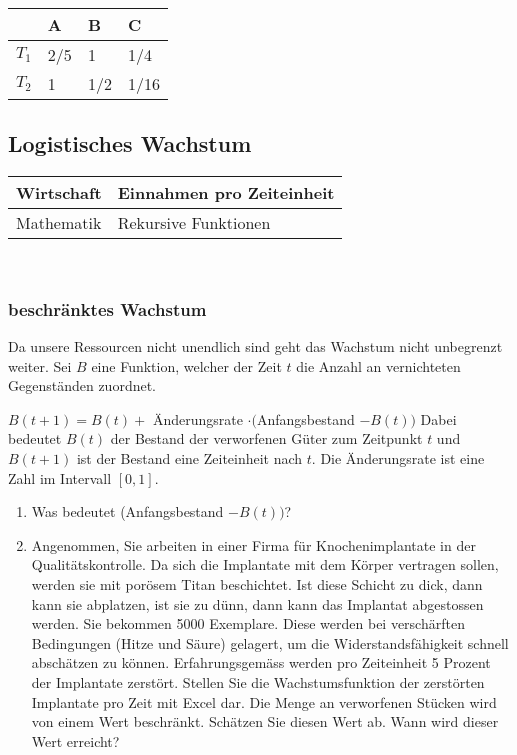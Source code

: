 \documentclass[11pt, twocolumn, a4paper]{scrartcl}
\begin{document}
\begin{tabular}{l l l l}
\toprule
&A&B&C\\
\midrule
$T_1$&2/5&1&1/4\\
\midrule
$T_2$&1&1/2&1/16\\
\bottomrule
\end{tabular}


\subsection{Logistisches Wachstum}



\begin{tabular}{l l}
\toprule
Wirtschaft & Einnahmen pro Zeiteinheit \\
\midrule
Mathematik& Rekursive Funktionen \\

\bottomrule
\end{tabular}\\

\subsubsection{beschränktes Wachstum}
Da unsere Ressourcen nicht unendlich sind geht das Wachstum nicht unbegrenzt weiter.
Sei $B$ eine Funktion, welcher der Zeit $t$ die Anzahl an vernichteten Gegenständen zuordnet.

$B(t+1) = B(t) +$ Änderungsrate $\cdot ($Anfangsbestand $- B(t))$
Dabei bedeutet $B(t)$ der Bestand der verworfenen Güter zum Zeitpunkt $t$ und $B(t+1)$ ist der Bestand eine Zeiteinheit nach $t$. Die Änderungsrate ist eine Zahl im Intervall $[0,1]$.\\
\renewcommand{\labelenumi}{\roman{enumi})}
\begin{enumerate}

\item Was bedeutet (Anfangsbestand $- B(t))$?\\


\item Angenommen, Sie arbeiten in einer Firma für Knochenimplantate in der Qualitätskontrolle. Da sich die Implantate mit dem Körper vertragen sollen, werden sie mit porösem Titan beschichtet. Ist diese Schicht zu dick, dann kann sie abplatzen, ist sie zu dünn, dann kann das Implantat abgestossen werden. Sie bekommen 5000 Exemplare. Diese werden bei verschärften Bedingungen (Hitze und Säure) gelagert, um die Widerstandsfähigkeit schnell abschätzen zu können. Erfahrungsgemäss werden pro Zeiteinheit 5 Prozent der Implantate zerstört. Stellen Sie die Wachstumsfunktion der zerstörten Implantate pro Zeit mit Excel dar. Die Menge an verworfenen Stücken wird von einem Wert beschränkt. Schätzen Sie diesen Wert ab. Wann wird dieser Wert erreicht?
\end{enumerate}
\end{document}
